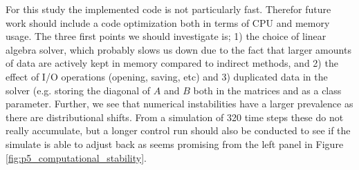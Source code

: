 \documentclass[../main_proj5.tex]{subfiles}
\begin{document}
For this study the implemented code is not particularly fast. Therefor future work should include a code optimization both in terms of CPU and memory usage. The three first points we should investigate is; 1) the choice of linear algebra solver, which probably slows us down due to the fact that larger amounts of data are actively kept in memory compared to indirect methods, and 2) the effect of I/O operations (opening, saving, etc) and 3) duplicated data in the solver (e.g. storing the diagonal of $A$ and $B$ both in the matrices and as a class parameter. Further, we see that numerical instabilities have a larger prevalence as there are distributional shifts. From a simulation of 320 time steps these do not really accumulate, but a longer control run should also be conducted to see if the simulate is able to adjust back as seems promising from the left panel in Figure \ref{fig:p5_computational_stability}.
\end{document}
